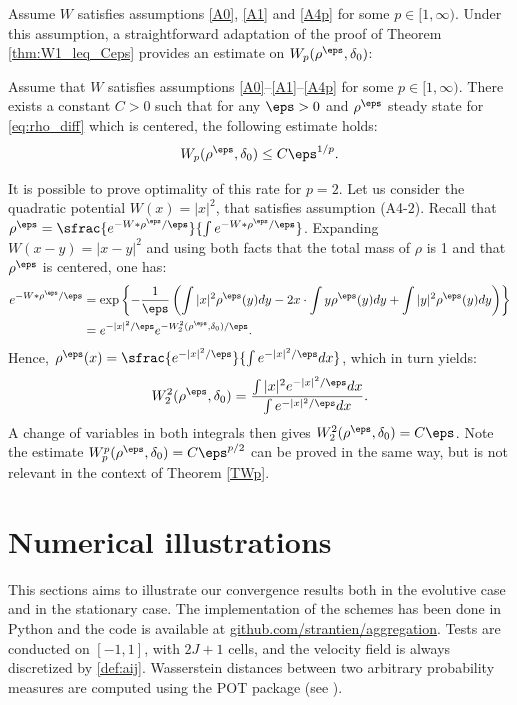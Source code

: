 Assume $W$ satisfies assumptions \eqref{A0}, \eqref{A1} and \eqref{A4p} for some $p \in [1, \infty)$. Under this assumption, a straightforward adaptation of the proof of Theorem \ref{thm:W1_leq_Ceps} provides an estimate on $W_p(\rho^\eps, \delta_0)$:
\begin{theorem}\label{TWp}
Assume that $W$ satisfies assumptions \eqref{A0}--\eqref{A1}--\eqref{A4p} for some $p \in [1, \infty)$. There exists a constant $C > 0$ such that for any $\eps>0$ and $\rho^\eps$ steady state for \eqref{eq:rho_diff} which is centered, the following estimate holds:
\begin{equation}\label{Wp_leq_Ceps_bis}
W_p(\rho^\eps, \delta_0) \leq C\eps^{1/p}.
\end{equation}
\end{theorem}
\begin{remark}
It is possible to prove optimality of this rate for $p=2$. Let us consider the quadratic potential $W(x) = |x|^2$, that satisfies assumption (A4-$2$). Recall that $\rho^\eps = \sfrac{e^{-W * \rho^\eps / \eps}}{\int e^{-W * \rho^\eps / \eps}}$. Expanding $W(x-y) = |x-y|^2$ and using both facts that the total mass of $\rho$ is 1 and that $\rho^\eps$ is centered, one has:
\begin{align*}
e^{-W * \rho^\eps / \eps} & = \exp\left\lbrace -\frac{1}{\eps} \left(\int|x|^2 \rho^\eps(y) dy - 2x \cdot \int y \rho^\eps(y) dy + \int|y|^2\rho^\eps(y) dy \right) \right\rbrace \\
& = e^{-|x|^2/\eps} e^{-W_2^2(\rho^\eps, \delta_0)/\eps}.
\end{align*}
Hence, $\rho^\eps(x) = \sfrac{e^{-|x|^2 / \eps}}{\int e^{-|x|^2 / \eps} dx}$, which in turn yields:
\[
W_2^2(\rho^\eps, \delta_0) = \frac{\int |x|^2 e^{-|x|^2 / \eps} dx}{\int e^{-|x|^2 / \eps} dx}.
\]
A change of variables in both integrals then gives $W_2^2(\rho^\eps, \delta_0) = C\eps$. Note the estimate $W_p^p(\rho^\eps, \delta_0) = C\eps^{p/2}$ can be proved in the same way, but is not relevant in the context of Theorem \ref{TWp}.
\end{remark}

\section{Numerical illustrations}\label{section:numerics}

This sections aims to illustrate our convergence results both in the evolutive case and in the stationary case. The implementation of the schemes has been done in Python and the code is available at \href{https://github.com/strantien/aggregation}{github.com/strantien/aggregation}. Tests are conducted on $[-1,1]$, with $2J+1$ cells, and the velocity field is always discretized by \eqref{def:aij}. Wasserstein distances between two arbitrary probability measures are computed using the POT package (see \cite{flamary2021pot}).

